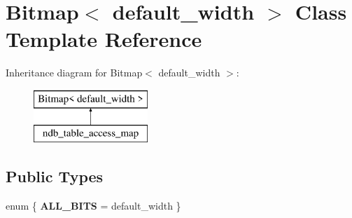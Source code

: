 \hypertarget{classBitmap}{}\section{Bitmap$<$ default\+\_\+width $>$ Class Template Reference}
\label{classBitmap}
Inheritance diagram for Bitmap$<$ default\+\_\+width $>$\+:\begin{figure}[H]
\begin{center}
\leavevmode
\includegraphics[height=2.000000cm]{classBitmap}
\end{center}
\end{figure}
\subsection*{Public Types}
\begin{DoxyCompactItemize}
\item 
\mbox{\label{classBitmap_a0d84fc947450e73cec0e65cd19802476}} 
enum \{ {\bfseries A\+L\+L\+\_\+\+B\+I\+TS} = default\+\_\+width
 \}
\end{DoxyCompactItemize}
